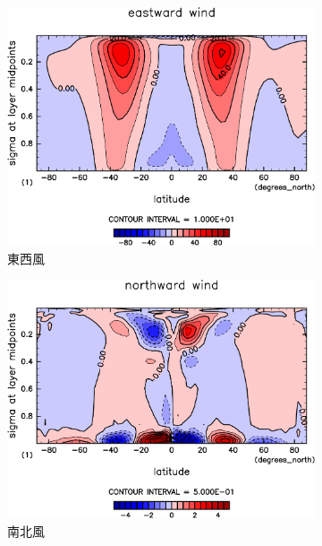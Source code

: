 \documentclass[body]{subfiles}
\begin{document}
\begin{figure}[t]
	\centering
	\begin{subfigure}{.4\textwidth}
		\centering
		\includegraphics[width=\columnwidth]{S1366/U,time=14600:14965-crop-rotate.pdf}
		\caption{東西風}\label{S1366東西風}
	\end{subfigure}
	\begin{subfigure}{.4\textwidth}
		\centering
		\includegraphics[width=\columnwidth]{S1366/V,time=14600:14965-crop-rotate.pdf}
		\caption{南北風}\label{S1366南北風}
	\end{subfigure}
	\begin{subfigure}{.4\textwidth}
		\centering

\end{subfigure}
\end{figure}
\end{document}
